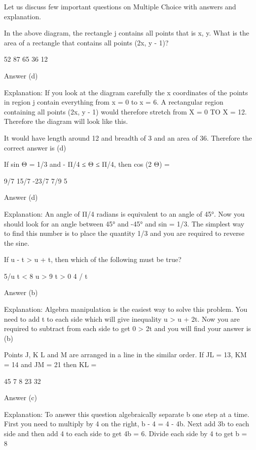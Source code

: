 
Let us discuss few important questions on Multiple Choice with answers and explanation.

    In the above diagram, the rectangle j contains all points that is x, y. What is the area of a rectangle that contains all points (2x, y - 1)?

        52
        87
        65
        36
        12 

    Answer (d)

    Explanation: If you look at the diagram carefully the x coordinates of the points in region j contain everything from x = 0 to x = 6. A rectangular region containing all points (2x, y - 1) would therefore stretch from X = 0 TO X = 12. Therefore the diagram will look like this.

    It would have length around 12 and breadth of 3 and an area of 36. Therefore the correct answer is (d)

    If sin Θ = 1/3 and - Π/4 ≤ Θ ≤ Π/4, then cos (2 Θ) =

          9/7
          15/7
          -23/7
          7/9
          5 

    Answer (d)

    Explanation: An angle of Π/4 radians is equivalent to an angle of 45°. Now you should look for an angle between 45° and -45° and sin = 1/3. The simplest way to find this number is to place the quantity 1/3 and you are required to reverse the sine.

    If u - t > u + t, then which of the following must be true?

        5/u
        t < 8
        u > 9
        t > 0
        4 / t 

    Answer (b)

    Explanation: Algebra manipulation is the easiest way to solve this problem. You need to add t to each side which will give inequality u > u + 2t. Now you are required to subtract from each side to get 0 > 2t and you will find your answer is (b)

    Points J, K L and M are arranged in a line in the similar order. If JL = 13, KM = 14 and JM = 21 then KL =

        45
        7
        8
        23
        32 

    Answer (c)

    Explanation: To answer this question algebraically separate b one step at a time. First you  need to multiply by 4 on the right, b - 4 = 4 - 4b. Next add 3b to each side and then add 4 to each side to get 4b = 6. Divide each side by 4 to get b = 8

